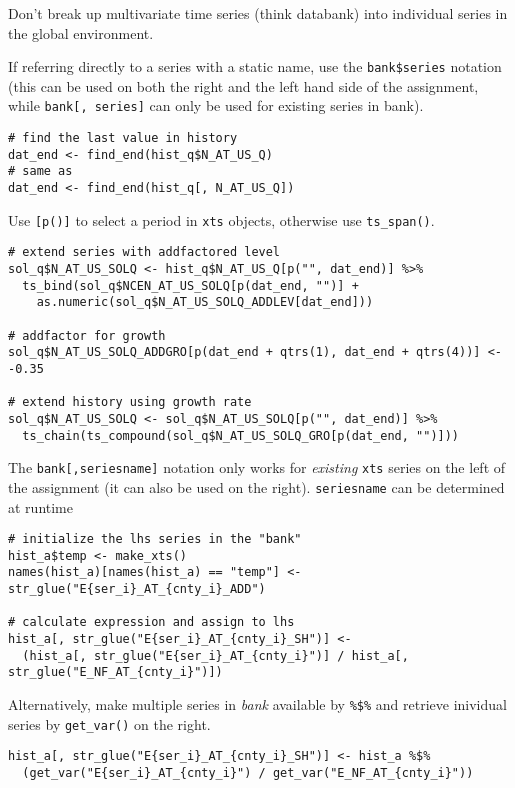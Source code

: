 \documentclass[
  letterpaper,
  DIV=11,
  numbers=noendperiod]{scrreport}
\begin{document}
Don't break up multivariate time series (think databank) into individual
series in the global environment.

If referring directly to a series with a static name, use the
\texttt{bank\$series} notation (this can be used on both the right and
the left hand side of the assignment, while \texttt{bank{[},\ series{]}}
can only be used for existing series in bank).

\begin{verbatim}
# find the last value in history
dat_end <- find_end(hist_q$N_AT_US_Q)
# same as
dat_end <- find_end(hist_q[, N_AT_US_Q])
\end{verbatim}

Use \texttt{{[}p(){]}} to select a period in \texttt{xts} objects,
otherwise use \texttt{ts\_span()}.

\begin{verbatim}
# extend series with addfactored level
sol_q$N_AT_US_SOLQ <- hist_q$N_AT_US_Q[p("", dat_end)] %>%
  ts_bind(sol_q$NCEN_AT_US_SOLQ[p(dat_end, "")] +
    as.numeric(sol_q$N_AT_US_SOLQ_ADDLEV[dat_end]))
    
# addfactor for growth
sol_q$N_AT_US_SOLQ_ADDGRO[p(dat_end + qtrs(1), dat_end + qtrs(4))] <- -0.35

# extend history using growth rate
sol_q$N_AT_US_SOLQ <- sol_q$N_AT_US_SOLQ[p("", dat_end)] %>%
  ts_chain(ts_compound(sol_q$N_AT_US_SOLQ_GRO[p(dat_end, "")]))
\end{verbatim}

The \texttt{bank{[},seriesname{]}} notation only works for
\emph{existing} \texttt{xts} series on the left of the assignment (it
can also be used on the right). \texttt{seriesname} can be determined at
runtime

\begin{verbatim}
# initialize the lhs series in the "bank"
hist_a$temp <- make_xts()
names(hist_a)[names(hist_a) == "temp"] <- str_glue("E{ser_i}_AT_{cnty_i}_ADD")

# calculate expression and assign to lhs
hist_a[, str_glue("E{ser_i}_AT_{cnty_i}_SH")] <- 
  (hist_a[, str_glue("E{ser_i}_AT_{cnty_i}")] / hist_a[, str_glue("E_NF_AT_{cnty_i}")])
\end{verbatim}

Alternatively, make multiple series in \emph{bank} available by
\texttt{\%\$\%} and retrieve inividual series by \texttt{get\_var()} on
the right.

\begin{verbatim}
hist_a[, str_glue("E{ser_i}_AT_{cnty_i}_SH")] <- hist_a %$%
  (get_var("E{ser_i}_AT_{cnty_i}") / get_var("E_NF_AT_{cnty_i}"))
\end{verbatim}
\end{document}
